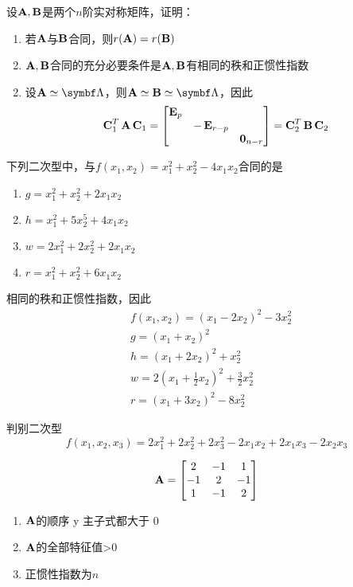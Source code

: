 \documentclass{article}
\begin{document}
\begin{examplle}[]
设\(\operatorname{\textbf{A}},\operatorname{\textbf{B}}\)是两个\(n\)阶实对称矩阵，证明：
\begin{enumerate}
\item 若\(\operatorname{\textbf{A}}\)与\(\operatorname{\textbf{B}}\)合同，则\(r(\operatorname{\textbf{A}})=r(\operatorname{\textbf{B}})\)
\item \(\operatorname{\textbf{A}},\operatorname{\textbf{B}}\)合同的充分必要条件是\(\operatorname{\textbf{A}},\operatorname{\textbf{B}}\)有相同的秩和正惯性指数
\end{enumerate}


\begin{enumerate}
\setcounter{enumi}{1}
\item 设\(\bA\simeq\bLambda\)，则\(\bA\simeq\bB\simeq\bLambda\)，因此
\begin{equation*}
\operatorname{\textbf{C}}_1^T\operatorname{\textbf{A}}\operatorname{\textbf{C}}_1=
\begin{bmatrix}
\operatorname{\textbf{E}}_p&&\\
&-\operatorname{\textbf{E}}_{r-p}&\\
&&\mathbf{0}_{n-r}
\end{bmatrix}=
\operatorname{\textbf{C}}_2^T\operatorname{\textbf{B}}\operatorname{\textbf{C}}_2
\end{equation*}
\end{enumerate}
\end{examplle}

\begin{examplle}[]
下列二次型中，与\(f(x_1,x_2)=x_1^2+x_2^2-4x_1x_2\)合同的是
\begin{enumerate}
\item \(g=x_1^2+x_2^2+2x_1x_2\)
\item \(h=x_1^2+5x_2^5+4x_1x_2\)
\item \(w=2x_1^2+2x_2^2+2x_1x_2\)
\item \(r=x_1^2+x_2^2+6x_1x_2\)
\end{enumerate}


相同的秩和正惯性指数，因此
\begin{align*}
&f(x_1,x_2)=(x_1-2x_2)^2-3x_2^2\\
&g=(x_1+x_2)^2\\
&h=(x_1+2x_2)^2+x_2^2\\
&w=2(x_1+\frac{1}{2}x_2)^2+\frac{3}{2}x_2^2\\
&r=(x_1+3x_2)^2-8x_2^2
\end{align*}
\end{examplle}

\begin{examplle}[]
判别二次型
\begin{equation*}
f(x_1,x_2,x_3)=2x_1^2+2x_2^2+2x_3^2-2x_1x_2+2x_1x_3-2x_2x_3
\end{equation*}

\begin{equation*}
\operatorname{\textbf{A}}=
\begin{bmatrix}
2&-1&1\\
-1&2&-1\\
1&-1&2
\end{bmatrix}
\end{equation*}

\begin{enumerate}
\item \(\operatorname{\textbf{A}}\)的顺序 y 主子式都大于 0
\item \(\operatorname{\textbf{A}}\)的全部特征值>0
\item 正惯性指数为\(n\)
\end{enumerate}
\end{examplle}
\end{document}
